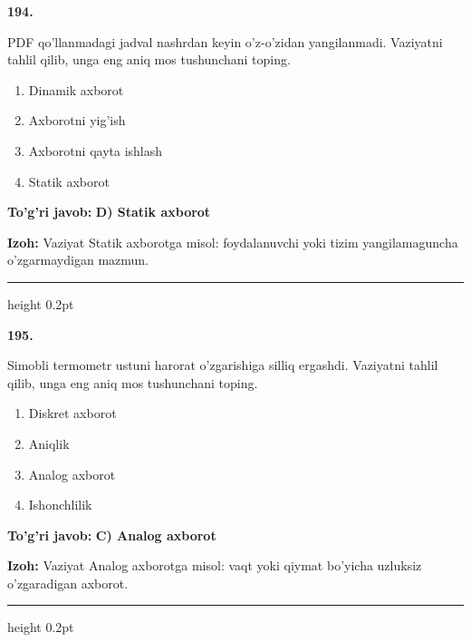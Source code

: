 \documentclass[10pt,a4paper,oneside]{article}
\begin{document}
\noindent\textbf{\color{ink}194.}
\par
PDF qo'llanmadagi jadval nashrdan keyin o'z-o'zidan yangilanmadi. Vaziyatni tahlil qilib, unga eng aniq mos tushunchani toping.
\begin{enumerate}[label=\Alph*),leftmargin=9mm]
\item Dinamik axborot
\item Axborotni yig'ish
\item Axborotni qayta ishlash
\item Statik axborot
\end{enumerate}
\begin{tcolorbox}[enhanced,breakable,colback=teal!4,colframe=teal!50!black,boxrule=0.5pt,arc=1.1mm,left=3mm,right=3mm,top=1.7mm,bottom=1.7mm,before skip=2mm,after skip=2mm]
\textbf{\color{teal}To'g'ri javob:} \textbf{D) Statik axborot}
\par\smallskip
\textbf{Izoh:} Vaziyat Statik axborotga misol: foydalanuvchi yoki tizim yangilamaguncha o'zgarmaydigan mazmun.
\end{tcolorbox}
\vspace{2mm}\hrule height 0.2pt \vspace{3mm}

\noindent\textbf{\color{ink}195.}
\par
Simobli termometr ustuni harorat o'zgarishiga silliq ergashdi. Vaziyatni tahlil qilib, unga eng aniq mos tushunchani toping.
\begin{enumerate}[label=\Alph*),leftmargin=9mm]
\item Diskret axborot
\item Aniqlik
\item Analog axborot
\item Ishonchlilik
\end{enumerate}
\begin{tcolorbox}[enhanced,breakable,colback=teal!4,colframe=teal!50!black,boxrule=0.5pt,arc=1.1mm,left=3mm,right=3mm,top=1.7mm,bottom=1.7mm,before skip=2mm,after skip=2mm]
\textbf{\color{teal}To'g'ri javob:} \textbf{C) Analog axborot}
\par\smallskip
\textbf{Izoh:} Vaziyat Analog axborotga misol: vaqt yoki qiymat bo'yicha uzluksiz o'zgaradigan axborot.
\end{tcolorbox}
\vspace{2mm}\hrule height 0.2pt \vspace{3mm}
\end{document}
